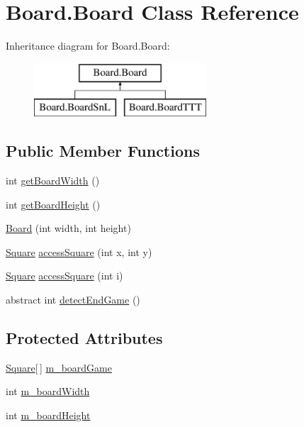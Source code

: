 \hypertarget{class_board_1_1_board}{}\section{Board.\+Board Class Reference}
\label{class_board_1_1_board}
Inheritance diagram for Board.\+Board\+:\begin{figure}[H]
\begin{center}
\leavevmode
\includegraphics[height=2.000000cm]{class_board_1_1_board}
\end{center}
\end{figure}
\subsection*{Public Member Functions}
\begin{DoxyCompactItemize}
\item 
int \hyperlink{class_board_1_1_board_a2eac3ef13d90ea0dfdc2c198bcab030d}{get\+Board\+Width} ()
\item 
int \hyperlink{class_board_1_1_board_a76b63d4d319e6a0f9f574a3fa8e5d00b}{get\+Board\+Height} ()
\item 
\hyperlink{class_board_1_1_board_a346819dc6f781a6a6c03a2bf8219e1e0}{Board} (int width, int height)
\item 
\hyperlink{class_square_1_1_square}{Square} \hyperlink{class_board_1_1_board_a279f8936c2da2be7c0c12d61212a7591}{access\+Square} (int x, int y)
\item 
\hyperlink{class_square_1_1_square}{Square} \hyperlink{class_board_1_1_board_aa2e9404b4c5fa4b7c22376610f172da8}{access\+Square} (int i)
\item 
abstract int \hyperlink{class_board_1_1_board_a1e4af7a26127d7f715c9df3d058ac97e}{detect\+End\+Game} ()
\end{DoxyCompactItemize}
\subsection*{Protected Attributes}
\begin{DoxyCompactItemize}
\item 
\hyperlink{class_square_1_1_square}{Square}\mbox{[}$\,$\mbox{]} \hyperlink{class_board_1_1_board_aede8ecf481e3981e0ec04d7bd3520bea}{m\+\_\+board\+Game}
\item 
int \hyperlink{class_board_1_1_board_a811ddc59658729b3cdb0a2db75465334}{m\+\_\+board\+Width}
\item 
int \hyperlink{class_board_1_1_board_a4a513d0963fd4e135fac9d121aea3a98}{m\+\_\+board\+Height}
\end{DoxyCompactItemize}


